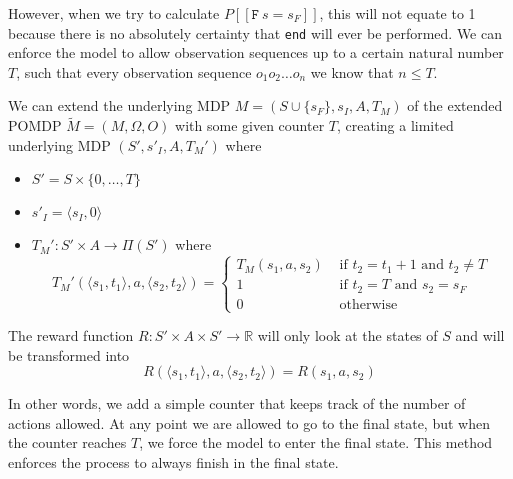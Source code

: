 \label{s:induced_limit}
However, when we try to calculate $P[[ \texttt{F}\:s=s_F]]$, this will not equate to 1 because there is no absolutely certainty that \texttt{end} will ever be performed. We can enforce the model to allow observation sequences up to a certain natural number $T$, such that every observation sequence $o_1 o_2 \dots o_n$ we know that $n\leq T$. 

\begin{definition}
We can extend the underlying MDP $M=(S\cup\{s_F\}, s_I, A, T_M)$ of the extended POMDP $\widetilde{M}=(M,\Omega,O)$ with some given counter $T$, creating a limited underlying MDP $(S',s'_I,A,T_M')$ where
\begin{itemize}
	\item $S' = S\times \{0,\dots, T\}$
	\item $s'_I = \langle s_I,0\rangle$
	\item $T_M':S'\times A \to \Pi(S')$ where 
	\[T_M'(\langle s_1,t_1\rangle,a,\langle s_2,t_2\rangle) = \begin{cases}
	T_M(s_1,a,s_2) & \text{ if } t_2 = t_1 + 1 \text{ and } t_2 \neq T\\
	1 & \text{ if } t_2 = T \text{ and } s_2 = s_F \\
	0 & \text{ otherwise }
	\end{cases}\]
\end{itemize}
\label{d:limited_pomdp}

The reward function $R:S'\times A\times S' \to \mathbb{R}$ will only look at the states of $S$ and will be transformed into
\[R(\langle s_1, t_1\rangle, a, \langle s_2, t_2\rangle) = R(s_1,a,s_2)\]
\end{definition}

In other words, we add a simple counter that keeps track of the number of actions allowed. At any point we are allowed to go to the final state, but when the counter reaches $T$, we force the model to enter the final state. This method enforces the process to always finish in the final state. \\


